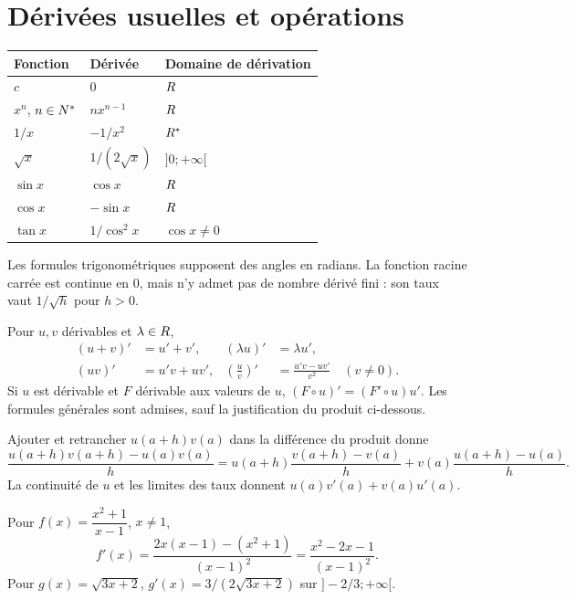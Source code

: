 \section{Dérivées usuelles et opérations}
\begin{center}\begin{tabular}{lll}\toprule
Fonction & Dérivée & Domaine de dérivation\\\midrule
$c$ & $0$ & $R$\\
$x^n$, $n\in N^*$ & $nx^{n-1}$ & $R$\\
$1/x$ & $-1/x^2$ & $R^*$\\
$\sqrt x$ & $1/(2\sqrt x)$ & $]0;+\infty[$\\
$\sin x$ & $\cos x$ & $R$\\
$\cos x$ & $-\sin x$ & $R$\\
$\tan x$ & $1/\cos^2x$ & $\cos x\ne0$\\\bottomrule
\end{tabular}\end{center}
Les formules trigonométriques supposent des angles en radians. La fonction racine carrée est continue en $0$, mais n’y admet pas de nombre dérivé fini : son taux vaut $1/\sqrt h$ pour $h>0$.
\begin{propriete}[opérations]
Pour $u,v$ dérivables et $\lambda\in R$,
\[
\begin{aligned}
(u+v)'&=u'+v',& (\lambda u)'&=\lambda u',\\
(uv)'&=u'v+uv',& \left(\frac uv\right)'&=\frac{u'v-uv'}{v^2}\quad(v\ne0).
\end{aligned}
\]
Si $u$ est dérivable et $F$ dérivable aux valeurs de $u$, $(F\circ u)'=(F'\circ u)u'$. Les formules générales sont admises, sauf la justification du produit ci-dessous.
\end{propriete}
\begin{demonstration}[produit]
Ajouter et retrancher $u(a+h)v(a)$ dans la différence du produit donne
\[
\frac{u(a+h)v(a+h)-u(a)v(a)}h
=u(a+h)\frac{v(a+h)-v(a)}h
+v(a)\frac{u(a+h)-u(a)}h.
\]
La continuité de $u$ et les limites des taux donnent $u(a)v'(a)+v(a)u'(a)$.
\end{demonstration}
\begin{exemple}Pour $f(x)=\dfrac{x^2+1}{x-1}$, $x\ne1$,
\[
f'(x)=\frac{2x(x-1)-(x^2+1)}{(x-1)^2}
=\frac{x^2-2x-1}{(x-1)^2}.
\]
Pour $g(x)=\sqrt{3x+2}$, $g'(x)=3/(2\sqrt{3x+2})$ sur $]-2/3;+\infty[$.
\end{exemple}
